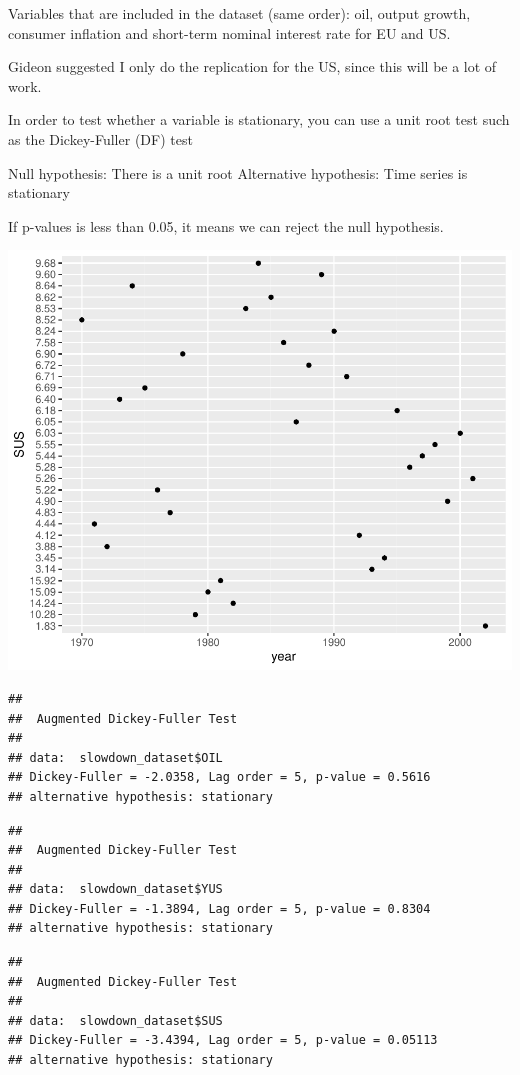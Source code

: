 \documentclass[11pt,preprint, authoryear]{elsarticle}
\numberwithin{equation}{section}
\numberwithin{figure}{section}
\numberwithin{table}{section}
\begin{document}
Variables that are included in the dataset (same order): oil, output
growth, consumer inflation and short-term nominal interest rate for EU
and US.

Gideon suggested I only do the replication for the US, since this will
be a lot of work.

In order to test whether a variable is stationary, you can use a unit
root test such as the Dickey-Fuller (DF) test

Null hypothesis: There is a unit root Alternative hypothesis: Time
series is stationary

If p-values is less than 0.05, it means we can reject the null
hypothesis.

\includegraphics{replication_files/figure-latex/unnamed-chunk-1-1.pdf}

\begin{verbatim}
## 
##  Augmented Dickey-Fuller Test
## 
## data:  slowdown_dataset$OIL
## Dickey-Fuller = -2.0358, Lag order = 5, p-value = 0.5616
## alternative hypothesis: stationary
\end{verbatim}

\begin{verbatim}
## 
##  Augmented Dickey-Fuller Test
## 
## data:  slowdown_dataset$YUS
## Dickey-Fuller = -1.3894, Lag order = 5, p-value = 0.8304
## alternative hypothesis: stationary
\end{verbatim}

\begin{verbatim}
## 
##  Augmented Dickey-Fuller Test
## 
## data:  slowdown_dataset$SUS
## Dickey-Fuller = -3.4394, Lag order = 5, p-value = 0.05113
## alternative hypothesis: stationary
\end{verbatim}
\end{document}
